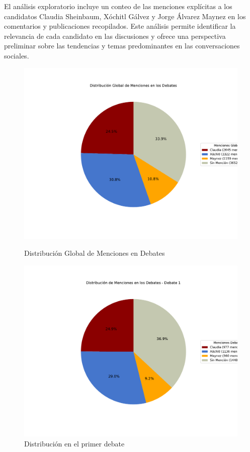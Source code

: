 \documentclass[10pt, a4paper]{article}
\begin{document}
	El análisis exploratorio incluye un conteo de las menciones explícitas a los candidatos Claudia Sheinbaum, Xóchitl Gálvez y Jorge Álvarez Maynez en los comentarios y publicaciones recopilados. Este análisis permite identificar la relevancia de cada candidato en las discusiones y ofrece una perspectiva preliminar sobre las tendencias y temas predominantes en las conversaciones sociales.
		
	\begin{figure}[h!]
		\centering
		\begin{minipage}{0.49\textwidth} %
			\includegraphics[width=\linewidth]{grafica_global_debates.pdf} 
			\caption{Distribución Global de Menciones en Debates}
			\label{fig:globalDebates}
		\end{minipage}
		\hfill %
		\begin{minipage}{0.49\textwidth}
			\includegraphics[width=\linewidth]{grafica_debate1.pdf}
			\caption{Distribución en el primer debate}
			\label{fig:distrDebate1}
		\end{minipage}
	\end{figure}
	
\end{document}
